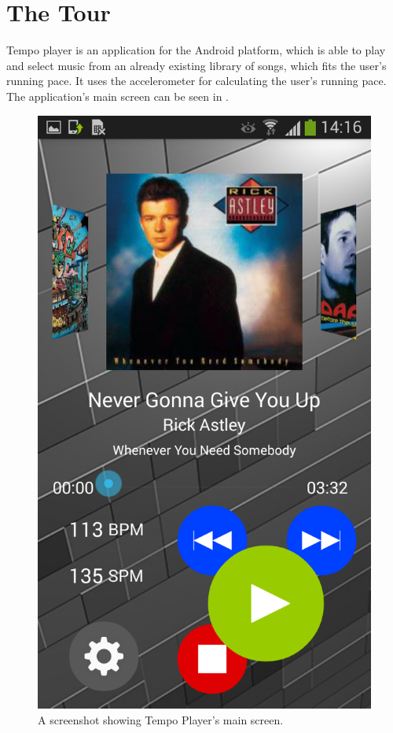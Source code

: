 \section{The Tour}
Tempo player is an application for the Android platform, which is able to play and select music from an already existing library of songs, which fits the user's running pace. It uses the accelerometer for calculating the user's running pace. The application's main screen can be seen in . 

\begin{figure}[h!]
  \centering
    \includegraphics[scale=0.1]{Images/Screenshots/mainScreen.png}
  \caption{A screenshot showing Tempo Player's main screen.}
  \label{fig:mainScreen}
\end{figure}

